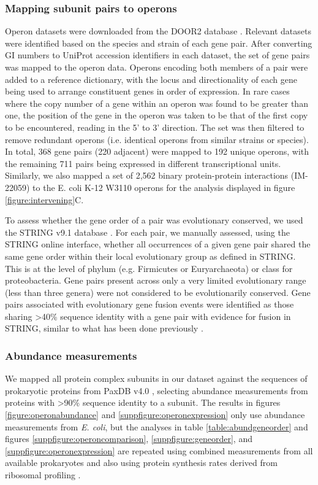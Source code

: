 \documentclass[a4paper,11pt,twoside,openright]{scrbook}
\begin{document}
\subsubsection{Mapping subunit pairs to operons}
Operon datasets were downloaded from the DOOR2 database \cite{Mao2014}. Relevant datasets were identified based on the species and strain of each gene pair. After converting GI numbers to UniProt accession identifiers in each dataset, the set of gene pairs was mapped to the operon data. Operons encoding both members of a pair were added to a reference dictionary, with the locus and directionality of each gene being used to arrange constituent genes in order of expression. In rare cases where the copy number of a gene within an operon was found to be greater than one, the position of the gene in the operon was taken to be that of the first copy to be encountered, reading in the 5' to 3' direction. The set was then filtered to remove redundant operons (i.e. identical operons from similar strains or species). In total, 368 gene pairs (220 adjacent) were mapped to 192 unique operons, with the remaining 711 pairs being expressed in different transcriptional units. Similarly, we also mapped a set of 2,562 binary protein-protein interactions (IM-22059) \cite{Rajagopala2014} to the E. coli K-12 W3110 operons for the analysis displayed in figure \ref{figure:intervening}C.

To assess whether the gene order of a pair was evolutionary conserved, we used the STRING v9.1 database \cite{Franceschini2013}. For each pair, we manually assessed, using the STRING online interface, whether all occurrences of a given gene pair shared the same gene order within their local evolutionary group as defined in STRING. This is at the level of phylum (e.g. Firmicutes or Euryarchaeota) or class for proteobacteria. Gene pairs present across only a very limited evolutionary range (less than three genera) were not considered to be evolutionarily conserved. Gene pairs associated with evolutionary gene fusion events were identified as those sharing >40\% sequence identity with a gene pair with evidence for fusion in STRING, similar to what has been done previously \cite{Marsh2013}.

\subsubsection{Abundance measurements}
We mapped all protein complex subunits in our dataset against the sequences of prokaryotic proteins from PaxDB v4.0 \cite{Wang2015}, selecting abundance measurements from proteins with >90\% sequence identity to a subunit. The results in figures \ref{figure:operonabundance} and \ref{suppfigure:operonexpression} only use abundance measurements from \textit{E. coli}, but the analyses in table \ref{table:abundgeneorder} and figures \ref{suppfigure:operoncomparison}, \ref{suppfigure:geneorder}, and \ref{suppfigure:operonexpression} are repeated using combined measurements from all available prokaryotes and also using protein synthesis rates derived from ribosomal profiling \cite{Li2014b}.
\end{document}
